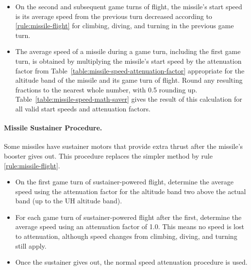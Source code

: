 \begin{advancedrules}
{\begin{itemize}
\item
On the second and subsequent game turns of flight, the missile’s start speed is its average speed from the previous turn decreased according to \ref{rule:missile-flight} for climbing, diving, and turning in the previous game turn.

\item 
The average speed of a missile during a game turn, including the first game turn, is obtained by multiplying the missile’s start speed by the attenuation factor from Table~\ref{table:missile-speed-attenuation-factor} appropriate for the altitude band of the missile and its game turn of flight. Round any resulting fractions to the nearest whole number, with 0.5 rounding up. Table~\ref{table:missile-speed-math-saver} gives the result of this calculation for all valid start speeds and attenuation factors.
\end{itemize}

\paragraph{Missile Sustainer Procedure.} Some missiles have sustainer motors that provide extra thrust after the missile’s booster gives out. This procedure replaces the simpler method by rule \ref{rule:missile-flight}.

\begin{itemize}
    \item On the first game turn of sustainer-powered flight, determine the average speed using the attenuation factor for the altitude band two above the actual band (up to the UH altitude band).
    
    \item For each game turn of sustainer-powered flight after the first, determine the average speed using an attenuation factor of 1.0. This means no speed is lost to attenuation, although speed changes from climbing, diving, and turning still apply.

    \item Once the sustainer gives out, the normal speed attenuation procedure is used.
\end{itemize}

}

\end{advancedrules}
